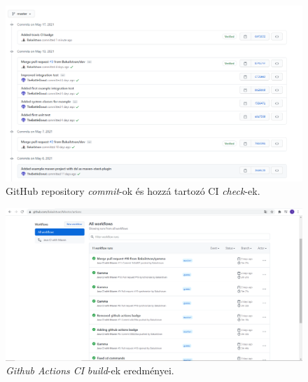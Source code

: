 \begin{figure}[!ht]
    \centering
    \includegraphics[width=150mm, keepaspectratio]{figures/github_ci_check.png}
    \caption{GitHub repository \textit{commit}-ok és hozzá tartozó CI \textit{check}-ek.}
    \label{commit_ci_check}
\end{figure}

\begin{figure}[!ht]
    \centering
    \includegraphics[width=150mm, keepaspectratio]{figures/github_ci_builds.png}
    \caption{\textit{Github Actions CI} \textit{build}-ek eredményei.}
    \label{github_actions}
\end{figure}

